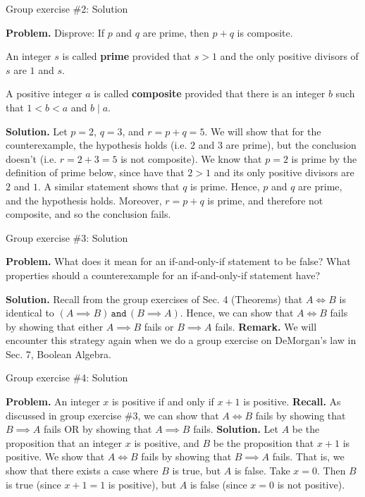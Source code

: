 \documentclass[10pt]{beamer}
\begin{document}
\begin{frame}{Group exercise \#2: Solution}

\textbf{Problem.} Disprove: If $p$ and $q$ are prime, then $p+q$ is composite. \pause 
% 
\vspace{-.1cm}
%
\begin{mygreenbox}[title=Reference: Scheinerman Def. 3.5]
An integer $s$ is called \textbf{prime} provided that $s>1$ and the only positive divisors of $s$ are $1$ and $s$. 
\end{mygreenbox}
\begin{mygreenbox}[title=Reference: Scheinerman Def. 3.6]
A positive integer $a$ is called \textbf{composite} provided that there is an integer $b$  such that $1<b<a$ and $b \mid a$. 
\end{mygreenbox}
%
\vspace{-.2cm}
%
\pause 
\textbf{Solution.}  Let $p=2$, $q=3$, and $r=p+q=5$.  We will show that for the counterexample, the hypothesis holds (i.e. $2$ and $3$ are prime), but the conclusion doesn't (i.e. $r=2 + 3 = 5$ is not composite). We know that $p=2$ is prime by the definition of prime below, since have that $2>1$ and its only positive divisors are $2$ and $1$.  A similar statement shows that $q$ is prime.  Hence, $p$ and $q$ are prime, and the hypothesis holds.  Moreover, $r=p+q$ is prime, and therefore not composite, and so the conclusion fails.


   
\end{frame}


\begin{frame}{Group exercise \#3: Solution}

\textbf{Problem.} What does it mean for an if-and-only-if statement to be false? What properties should a counterexample for an if-and-only-if statement have?
\vfill 

\textbf{Solution.} Recall from the group exercises of Sec. 4 (Theorems) that $A \iff B$ is identical to $(A \implies B) \, \texttt{and} \, (B \implies A)$.  Hence, we can show that $A \iff B$ fails by showing that either $A \implies B$ fails or $B \implies A$ fails.
\vfill 
\pause 
\textbf{Remark.} We will encounter this strategy again when we do a group exercise on DeMorgan's law in Sec. 7, Boolean Algebra.
\end{frame}

\begin{frame}{Group exercise \#4: Solution}

\textbf{Problem.} An integer $x$ is positive if and only if $x+1$ is positive.
\pause 
\vfill 
\textbf{Recall.} As discussed in group exercise \#3, we can show that $A \iff B$ fails by showing that $B \implies A$ fails OR by showing that $A \implies B$ fails. 
\vfill 
\pause 
\textbf{Solution.}  Let $A$ be the proposition that an integer $x$ is positive, and $B$ be the proposition that $x+1$ is positive.  We show that $A \iff B$ fails by showing that $B \implies A$ fails.   That is, we show that there exists a case where $B$ is true, but $A$ is false.  Take $x=0$. Then $B$ is true (since $x+1=1$ is positive), but $A$ is false (since $x=0$ is not positive).   
\end{frame}
\end{document}

